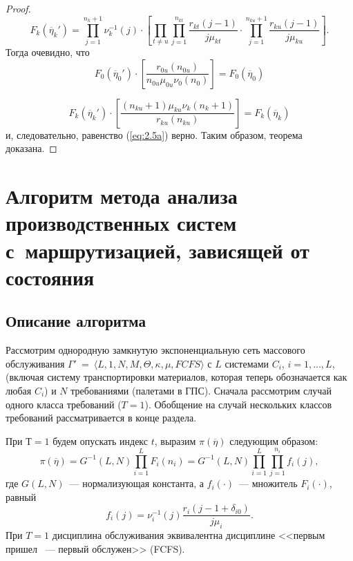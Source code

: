 \begin{proof}
 \begin{equation*}
  F_k(\overline{\eta}_k ') = \prod_{j=1}^{n_k+1} \nu_k^{-1}(j) \cdot
  \left[
  \prod_{t \neq u} \prod_{j=1}^{n_{kt}} \frac{r_{kt}(j-1)}{j\mu_{kt}} \cdot
  \prod_{j=1}^{n_{ku}+1} \frac{r_{ku}(j-1)}{j\mu_{ku}}
  \right] .
 \end{equation*}
 Тогда очевидно, что
 \begin{equation*}
  F_0(\overline{\eta}_0 ') \cdot \left[ \frac{r_{0u}(n_{0u})}{n_{0u}\mu_{0u}\nu_0(n_0)} \right] =
  F_0(\overline{\eta}_0)
 \end{equation*}

 \begin{equation*}
  F_k(\overline{\eta}_k ') \cdot \left[ \frac{(n_{ku}+1) \mu_{ku} \nu_k (n_k+1)}{r_{ku}(n_{ku})} \right] =
  F_k(\overline{\eta}_k)
 \end{equation*}
 и, следовательно, равенство (\ref{eq:2.5a}) верно. Таким образом, теорема доказана.
\end{proof}




\section{Алгоритм метода анализа производственных систем с~маршрутизацией, зависящей от состояния}
\label{sec:algorithm}

\subsection{Описание алгоритма}
\label{subsec:algorithm_description}

Рассмотрим однородную замкнутую экспоненциальную сеть массового обслуживания $\Gamma'~=~\langle L, 1, N, M, \Theta, \kappa, \mu, FCFS \rangle$ с $L$ системами $C_i$, $i=1,...,L$, (включая систему транспортировки материалов, которая теперь обозначается как любая $C_i$) и $N$ требованиями (палетами в ГПС). Сначала рассмотрим случай одного класса требований ($T=1$). Обобщение на случай нескольких классов требований рассматривается в конце раздела.

При $Т=1$ будем опускать индекс $t$, выразим $\pi(\overline{\eta})$ следующим образом:
\begin{equation}
 \pi(\overline{\eta}) = G^{-1}(L,N) \prod_{i=1}^L F_i(n_i) = G^{-1}(L,N) \prod_{i=1}^L
 \prod_{j=1}^{n_{i}} f_i(j) ,
 \label{eq:3.1}
\end{equation}
где $G(L,N)$~--- нормализующая константа, а $f_i(\cdot)$~--- множитель $F_i(\cdot)$, равный
\begin{equation*}
f_i(j) = \nu_i^{-1}(j) \frac{r_i(j-1+\delta_{i0})}{j \mu_i}.
\end{equation*}
При $T=1$ дисциплина обслуживания эквивалентна дисциплине <<первым пришел ~--- первый обслужен>> (FCFS).

